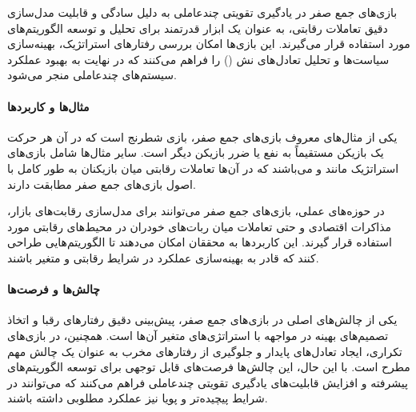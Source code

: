 بازی‌های جمع صفر در یادگیری تقویتی چندعاملی به دلیل سادگی و قابلیت مدل‌سازی دقیق تعاملات رقابتی، به عنوان یک ابزار قدرتمند برای تحلیل و توسعه الگوریتم‌های  مورد استفاده قرار می‌گیرند. این بازی‌ها امکان بررسی رفتارهای استراتژیک، بهینه‌سازی سیاست‌ها و تحلیل تعادل‌های نش () را فراهم می‌کنند که در نهایت به بهبود عملکرد سیستم‌های چندعاملی منجر می‌شود.

\paragraph{مثال‌ها و کاربردها}
یکی از مثال‌های معروف بازی‌های جمع صفر، بازی شطرنج است که در آن هر حرکت یک بازیکن مستقیماً به نفع یا ضرر بازیکن دیگر است. سایر مثال‌ها شامل بازی‌های استراتژیک مانند  و  می‌باشند که در آن‌ها تعاملات رقابتی میان بازیکنان به طور کامل با اصول بازی‌های جمع صفر مطابقت دارند.

در حوزه‌های عملی، بازی‌های جمع صفر می‌توانند برای مدل‌سازی رقابت‌های بازار، مذاکرات اقتصادی و حتی تعاملات میان ربات‌های خودران در محیط‌های رقابتی مورد استفاده قرار گیرند. این کاربردها به محققان امکان می‌دهند تا الگوریتم‌هایی طراحی کنند که قادر به بهینه‌سازی عملکرد در شرایط رقابتی و متغیر باشند.

\paragraph{چالش‌ها و فرصت‌ها}
یکی از چالش‌های اصلی در بازی‌های جمع صفر، پیش‌بینی دقیق رفتارهای رقبا و اتخاذ تصمیم‌های بهینه در مواجهه با استراتژی‌های متغیر آن‌ها است. همچنین، در بازی‌های تکراری، ایجاد تعادل‌های پایدار و جلوگیری از رفتارهای مخرب به عنوان یک چالش مهم مطرح است. با این حال، این چالش‌ها فرصت‌های قابل توجهی برای توسعه الگوریتم‌های پیشرفته و افزایش قابلیت‌های یادگیری تقویتی چندعاملی فراهم می‌کنند که می‌توانند در شرایط پیچیده‌تر و پویا نیز عملکرد مطلوبی داشته باشند.
